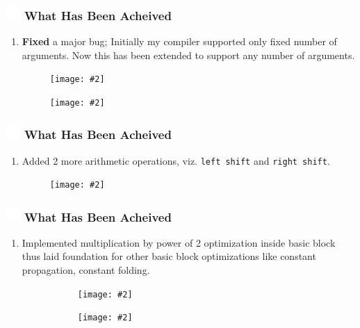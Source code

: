 \documentclass{beamer}
\newcommand{\iph}[2]{
    \texttt{[image: \#2]}
}
\newcommand{\ft}[1]{
  \frametitle{\includegraphics[height=0.55cm, width=0.55cm, keepaspectratio]{assets/tiger.png} #1}
}
\newcounter{saveenumi}
\newcommand{\seti}{\setcounter{saveenumi}{\value{enumi}}}
\newcommand{\conti}{\setcounter{enumi}{\value{saveenumi}}}
\begin{document}
\begin{frame}[fragile]
  \ft{What Has Been Acheived}
  \begin{enumerate}
    \conti
    \item \textbf{Fixed} a major bug; Initially my compiler supported only fixed number of arguments. Now this has been extended to support any number of arguments. 
    \begin{figure}
    \centering
    \iph{0.80}{assets/funargs.png}
    \label{fig:funargs}
    \end{figure}
    \begin{figure}
    \centering
    \iph{0.80}{assets/gitfunargs.png}
    \label{fig:gitfunargs}
    \end{figure}
    \seti
  \end{enumerate}
\end{frame}

\begin{frame}[fragile]
  \ft{What Has Been Acheived}
  \begin{enumerate}
    \conti
    \item Added 2 more arithmetic operations, viz. \texttt{left shift} and \texttt{right shift}. 
    \begin{figure}
    \centering
    \iph{0.80}{assets/shiftoperations.png}
    \label{fig:shiftoperations}
    \end{figure}
    \seti
  \end{enumerate}
\end{frame}

\begin{frame}[fragile]
  \ft{What Has Been Acheived}
  \begin{enumerate}
    \conti
    \item Implemented multiplication by power of 2 optimization inside basic block thus laid foundation for other basic block optimizations like constant propagation, constant folding.
    \begin{figure}[t!]
      \centering
      \begin{subfigure}[t]{\textwidth}
      \centering
      \iph{0.80}{assets/mulopt1.png}
      \label{fig:mulopt1}
      \end{subfigure}
      \begin{subfigure}[t]{0.8\textwidth}
      \centering
      \iph{0.70}{assets/mulopt2.png}
      \label{fig:mulopt2}
      \end{subfigure}
    \end{figure}
    \seti
  \end{enumerate}
\end{frame}
\end{document}

